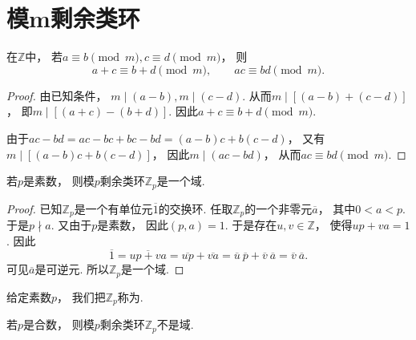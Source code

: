 \section{模m剩余类环}
\begin{proposition}
在\(\mathbb{Z}\)中，
若\(a\equiv b\pmod m,
c\equiv d\pmod m\)，
则\[
	a+c\equiv b+d\pmod m, \qquad
	ac\equiv bd\pmod m.
\]
\begin{proof}
由已知条件，
\(m\mid(a-b),
m\mid(c-d)\).
从而\(m\mid[(a-b)+(c-d)]\)，
即\(m\mid[(a+c)-(b+d)]\).
因此\(a+c\equiv b+d\pmod m\).

由于\(ac-bd
=ac-bc+bc-bd
=(a-b)c+b(c-d)\)，
又有\(m\mid[(a-b)c+b(c-d)]\)，
因此\(m\mid(ac-bd)\)，
从而\(ac\equiv bd\pmod m\).
\end{proof}
\end{proposition}

\begin{theorem}
若\(p\)是素数，
则模\(p\)剩余类环\(\mathbb{Z}_p\)是一个域.
\begin{proof}
已知\(\mathbb{Z}_p\)是一个有单位元\(\overline1\)的交换环.
任取\(\mathbb{Z}_p\)的一个非零元\(\overline{a}\)，
其中\(0<a<p\).
于是\(p \nmid a\).
又由于\(p\)是素数，
因此\((p,a)=1\).
于是存在\(u,v\in\mathbb{Z}\)，
使得\(up+va=1\).
因此\[
	\overline1
	=\overline{up+va}
	=\overline{up}
	+\overline{va}
	=\overline{u}~\overline{p}
	+\overline{v}~\overline{a}
	=\overline{v}~\overline{a}.
\]
可见\(\overline{a}\)是可逆元.
所以\(\mathbb{Z}_p\)是一个域.
\end{proof}
\end{theorem}

给定素数\(p\)，
我们把\(\mathbb{Z}_p\)称为.

\begin{theorem}
若\(p\)是合数，
则模\(p\)剩余类环\(\mathbb{Z}_p\)不是域.
\end{theorem}

